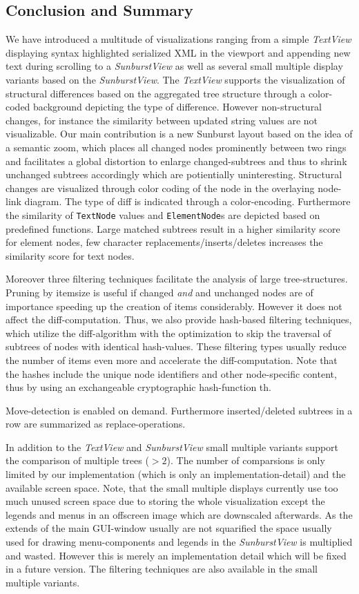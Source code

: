 \subsection{Conclusion and Summary}
We have introduced a multitude of visualizations ranging from a simple \emph{TextView} displaying syntax highlighted serialized XML in the viewport and appending new text during scrolling to a \emph{SunburstView} as well as several small multiple display variants based on the \emph{SunburstView}. The \emph{TextView} supports the visualization of structural differences based on the aggregated tree structure through a color-coded background depicting the type of difference. However non-structural changes, for instance the similarity between updated string values are not visualizable. Our main contribution is a new Sunburst layout based on the idea of a semantic zoom, which places all changed nodes prominently between two rings and facilitates a global distortion to enlarge changed-subtrees and thus to shrink unchanged subtrees accordingly which are potientially uninteresting. Structural changes are visualized through color coding of the node in the overlaying node-link diagram. The type of diff is indicated through a color-encoding. Furthermore the similarity of \texttt{TextNode} values and \texttt{ElementNode}s are depicted based on predefined functions. Large matched subtrees result in a higher similarity score for element nodes, few character replacements/inserts/deletes increases the similarity score for text nodes.

Moreover three filtering techniques facilitate the analysis of large tree-struc\-tures. Pruning by itemsize is useful if changed \emph{and} and unchanged nodes are of importance speeding up the creation of items considerably. However it does not affect the diff-computation. Thus, we also provide hash-based filtering techniques, which utilize the diff-algorithm with the optimization to skip the traversal of subtrees of nodes with identical hash-values. These filtering types usually reduce the number of items even more and accelerate the diff-computation. Note that the hashes include the unique node identifiers and other node-specific content, thus by using an exchangeable cryptographic hash-function th.  

Move-detection is enabled on demand. Furthermore inserted/deleted subtrees in a row are summarized as replace-operations.

In addition to the \emph{TextView} and \emph{SunburstView} small multiple variants support the comparison of multiple trees ($>2$). The number of comparsions is only limited by our implementation (which is only an implementation-detail) and the available screen space. Note, that the small multiple displays currently use too much unused screen space due to storing the whole visualization except the legends and menus in an offscreen image which are downscaled afterwards. As the extends of the main GUI-window usually are not squarified the space usually used for drawing menu-components and legends in the \emph{SunburstView} is multiplied and wasted. However this is merely an implementation detail which will be fixed in a future version. The filtering techniques are also available in the small multiple variants.

